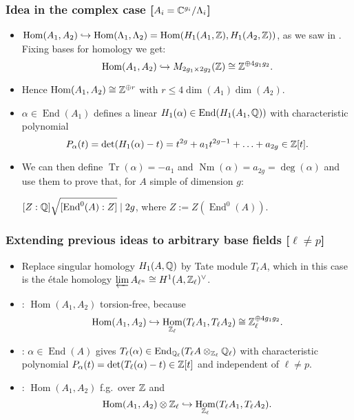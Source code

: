 \documentclass[notheorems, hyperref]{beamer}
\theoremstyle{darkgreentheorem}
\theoremstyle{darkbluedefinition}
\theoremstyle{darkredexample}
\theoremstyle{remark}
\DeclareMathOperator{\Hom}{Hom}
\DeclareMathOperator{\End}{End}
\newcommand{\ot}{\otimes}
\newcommand{\op}{\oplus}
\begin{document}
\begin{frame}
    \frametitle{Idea in the complex case [$A_{i}=\mathbb{C}^{g_{i}}/\Lambda_{i}$]}
    \begin{itemize}
	\item $\Hom(A_{1},A_{2})\hookrightarrow \Hom(\Lambda_{1},\Lambda_{2})=\Hom(H_{1}(A_{1},\Z),H_{1}(A_{2},\Z))$, as we saw in \cite[\S I.2]{mil08}.
	    Fixing bases for homology we get:
	    \[ \Hom(A_{1},A_{2})\hookrightarrow M_{2g_{1}\times 2g_{2}}(\Z)\cong \Z^{\op 4g_{1}g_{2}}. \]
	    \pause
	\item Hence $\Hom(A_{1},A_{2})\cong \Z^{\op r}$ with $r\leqslant 4\dim(A_{1})\dim(A_{2})$.
	    \pause
	\item $\alpha\in \End(A_{1})$ defines a linear $H_{1}(\alpha)\in \End(H_{1}(A_{1},\Q))$ with characteristic polynomial
	    \[ P_{\alpha}(t)=\det(H_{1}(\alpha)-t)=t^{2g}+a_{1}t^{2g-1}+\ldots +a_{2g} \in \mathbb{Z}[t]. \]
	    \pause
	\item We can then define $\operatorname{Tr}(\alpha)=-a_{1}$ and $\operatorname{Nm}(\alpha)=a_{2g}=\deg(\alpha)$ and use them to prove that, for $A$ simple of dimension $g$:
	\begin{tcolorbox}[colback=green!5!white,colframe=green!75!black]
	    $[Z:\Q] \sqrt{[\End^{0}(A):Z]} \mid 2g$, where $Z:=Z(\End^{0}(A))$.	
	\end{tcolorbox}
    \end{itemize}
\end{frame}

\begin{frame}
    \frametitle{Extending previous ideas to arbitrary base fields [$\ell\neq p$]}
    \begin{itemize}
	\item Replace singular homology $H_{1}(A,\mathbb{Q})$ by Tate module $T_{\ell}A$, which in this case is the étale homology $\varprojlim A_{\ell^{n}}\cong H^{1}(A,\mathbb{Z}_{\ell})^{\vee}$.
	    \pause
	\item \cite[Lemma I.10.6]{mil08}: $\Hom(A_{1},A_{2})$ torsion-free, because
	    \[ \Hom(A_{1},A_{2})\hookrightarrow \Hom_{\Z_{\ell}}(T_{\ell}A_{1},T_{\ell}A_{2})\cong \Z_{\ell}^{\op 4g_{1}g_{2}}. \]
	    \pause 
	\item \cite[Thm.~I.10.9 and Prop.~I.10.20]{mil08}: $\alpha\in \End(A)$ gives $T_{\ell}(\alpha)\in \End_{\Q_{\ell}}(T_{\ell}A\ot_{\Z_{\ell}}\Q_{\ell})$ with characteristic polynomial $P_{\alpha}(t)=\det(T_{\ell}(\alpha)-t)\in \mathbb{Z}[t]$ and independent of $\ell\neq p$.
	    \pause
	\item \cite[Thm.~I.10.15]{mil08}: $\Hom(A_{1},A_{2})$ f.g.~over $\mathbb{Z}$ and
	    \[ \Hom(A_{1},A_{2})\ot \Z_{\ell}\hookrightarrow \Hom_{\Z_{\ell}}(T_{\ell}A_{1},T_{\ell}A_{2}). \]
    \end{itemize}
\end{frame}
\end{document}
